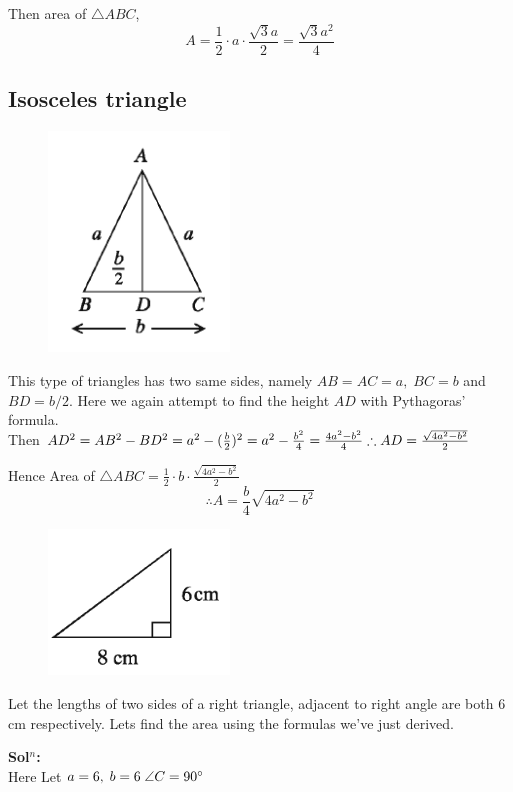 Then area of $\triangle ABC$,
\begin{equation}\label{e4}
A= \frac{1}{2}\cdot a\cdot \frac{\sqrt{3}a}{2}=\frac{\sqrt{3}a^2}{4}
\end{equation}


\subsection{Isosceles triangle}
\begin{figure}
	\includegraphics[width=1.9in]{pics/ist}
\end{figure}
This type of triangles has two same sides, namely $AB=AC=a,\; BC=b$ and $BD=b/2$. Here we again attempt to find the height $AD$ with Pythagoras' formula.\\

Then $AD^2=AB^2-BD^2\\
=a^2-(\frac{b}{2})^2\\
=a^2-\frac{b^2}{4}\\
=\frac{4a^2-b^2}{4}\\
\therefore AD=\frac{\sqrt{4a^2-b^2}}{2}\\$

Hence Area of $\triangle ABC= \frac{1}{2}\cdot b\cdot \frac{\sqrt{4a^2-b^2}}{2}$
\begin{equation}\label{e5}
	\therefore A=\frac{b}{4}\sqrt{4a^2-b^2}
\end{equation}



\begin{figure}
	\includegraphics[width=1.9in]{pics/e1}
\end{figure}
\begin{exmp}
Let the lengths of two sides of a right triangle, adjacent to right angle are both 6 cm  respectively. Lets find the area using the formulas we've just derived.
\end{exmp}
\textbf{Sol$^n$:}\\ 
Here Let $a=6,\; b=6\; \angle C=90\degree\\$


